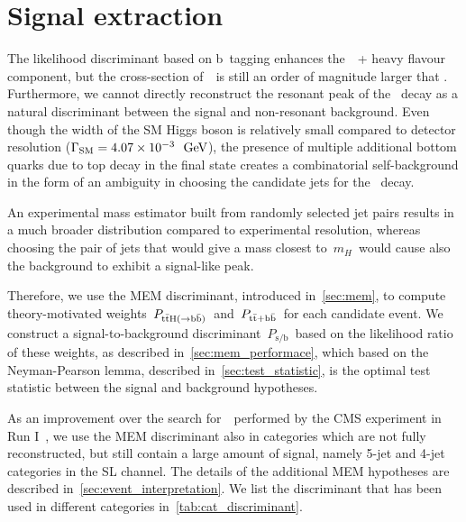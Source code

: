 \section{Signal extraction}
\label{sec:mem_application}
The likelihood discriminant based on b~tagging enhances the~\ttbar~+ heavy flavour component, but the cross-section of~\ttbb~is still an order of magnitude larger that \ttHbb. Furthermore, we cannot directly reconstruct the resonant peak of the \Hbb~decay as a natural discriminant between the signal and non-resonant background. Even though the width of the SM Higgs boson is relatively small compared to detector resolution ($\Gamma_{\mathrm{SM}} = 4.07 \times 10^{-3}~~\mathrm{GeV}$), the presence of multiple additional bottom quarks due to top decay in the final state creates a combinatorial self-background in the form of an ambiguity in choosing the candidate jets for the \Hbb~decay.

An experimental mass estimator built from randomly selected jet pairs results in a much broader distribution compared to experimental resolution, whereas choosing the pair of jets that would give a mass closest to~$m_H$~would cause also the background to exhibit a signal-like peak.

Therefore, we use the MEM discriminant, introduced in~\cref{sec:mem}, to compute theory-motivated weights~$P_{\mathrm{t} \bar{\mathrm{t}} \mathrm{H} (\rightarrow \mathrm{b}\bar{\mathrm{b}})}$~and~$P_{\mathrm{t} \bar{\mathrm{t}} + \mathrm{b}\bar{\mathrm{b}}}$~for each candidate event. We construct a signal-to-background discriminant~$P_{\mathrm{s/b}}$~based on the likelihood ratio of these weights, as described in~\cref{sec:mem_performace}, which based on the Neyman-Pearson lemma, described in~\cref{sec:test_statistic}, is the optimal test statistic between the signal and background hypotheses.

As an improvement over the search for~\ttHbb~performed by the CMS experiment in Run I~\cite{Khachatryan:2015ila}, we use the MEM discriminant also in categories which are not fully reconstructed, but still contain a large amount of signal, namely 5-jet and 4-jet categories in the SL channel. The details of the additional MEM hypotheses are described in~\cref{sec:event_interpretation}. We list the discriminant that has been used in different categories in~\cref{tab:cat_discriminant}. 



